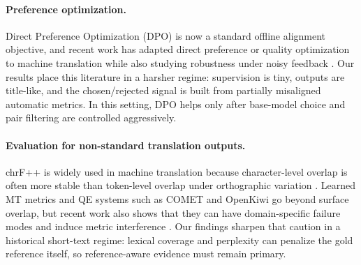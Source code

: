 \paragraph{Preference optimization.}
Direct Preference Optimization (DPO) is now a standard offline alignment objective, and recent work has adapted direct preference or quality optimization to machine translation while also studying robustness under noisy feedback \cite{rafailov2023dpo, uhlig2024dqo, yang2024dpombr, chowdhury2024robustdpo, zhou2024wpo}. Our results place this literature in a harsher regime: supervision is tiny, outputs are title-like, and the chosen/rejected signal is built from partially misaligned automatic metrics. In this setting, DPO helps only after base-model choice and pair filtering are controlled aggressively.

\paragraph{Evaluation for non-standard translation outputs.}
chrF++ is widely used in machine translation because character-level overlap is often more stable than token-level overlap under orthographic variation \cite{popovic2017chrfpp}. Learned MT metrics and QE systems such as COMET and OpenKiwi go beyond surface overlap, but recent work also shows that they can have domain-specific failure modes and induce metric interference \cite{rei2020comet, kepler2019openkiwi, zouhar2024cometpitfalls, pombal2025mint}. Our findings sharpen that caution in a historical short-text regime: lexical coverage and perplexity can penalize the gold reference itself, so reference-aware evidence must remain primary.
